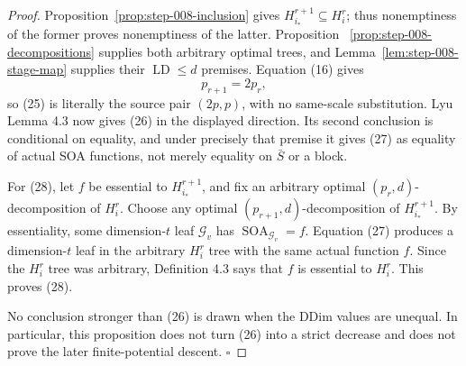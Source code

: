 \begin{proof}
Proposition~\ref{prop:step-008-inclusion} gives
\(H_{i_*}^{r+1}\subseteq H_i^r\); thus nonemptiness of the former proves
nonemptiness of the latter. Proposition
~\ref{prop:step-008-decompositions} supplies both arbitrary optimal trees,
and Lemma~\ref{lem:step-008-stage-map} supplies their
\(\operatorname{LD}\le d\) premises. Equation (16) gives
\[
 p_{r+1}=2p_r,
\]
so (25) is literally the source pair \((2p,p)\), with no same-scale
substitution. Lyu~\citep{lyu2025} Lemma 4.3 now gives (26) in the displayed direction.
Its second conclusion is conditional on equality, and under precisely that
premise it gives (27) as equality of actual SOA functions, not merely
equality on \(\bar S\) or a block.

For (28), let \(f\) be essential to \(H_{i_*}^{r+1}\), and fix an
arbitrary optimal \((p_r,d)\)-decomposition of \(H_i^r\). Choose any
optimal \((p_{r+1},d)\)-decomposition of \(H_{i_*}^{r+1}\). By essentiality,
some dimension-\(t\) leaf \(\mathcal G_v\) has
\(\operatorname{SOA}_{\mathcal G_v}=f\). Equation (27) produces a
dimension-\(t\) leaf in the arbitrary \(H_i^r\) tree with the same actual
function \(f\). Since the \(H_i^r\) tree was arbitrary, Definition 4.3 says
that \(f\) is essential to \(H_i^r\). This proves (28).

No conclusion stronger than (26) is drawn when the DDim values are unequal.
In particular, this proposition does not turn (26) into a strict decrease
and does not prove the later finite-potential descent. \(\square\)


\end{proof}


